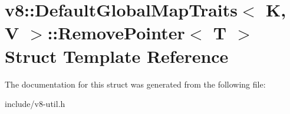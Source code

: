 \hypertarget{structv8_1_1_default_global_map_traits_1_1_remove_pointer}{}\section{v8\+:\+:Default\+Global\+Map\+Traits$<$ K, V $>$\+:\+:Remove\+Pointer$<$ T $>$ Struct Template Reference}
\label{structv8_1_1_default_global_map_traits_1_1_remove_pointer}


The documentation for this struct was generated from the following file\+:\begin{DoxyCompactItemize}
\item 
include/v8-\/util.\+h\end{DoxyCompactItemize}
